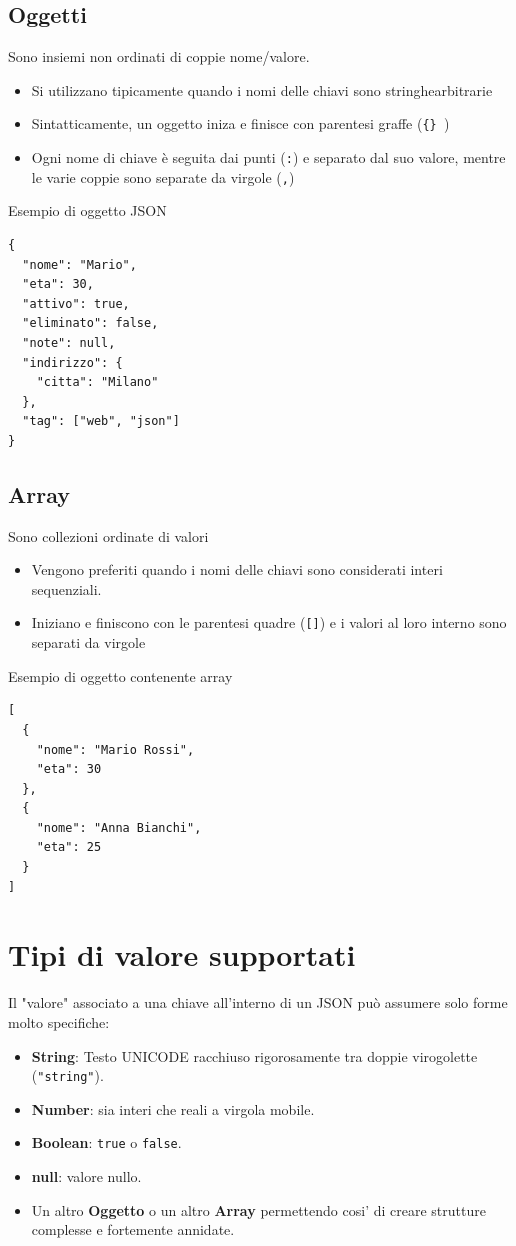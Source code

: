 \subsection{Oggetti}
Sono insiemi non ordinati di coppie nome/valore.
\begin{itemize}
    \item Si utilizzano tipicamente quando i nomi delle chiavi sono stringhearbitrarie
    \item Sintatticamente, un oggetto iniza e finisce con parentesi graffe (\texttt{\{\} })
    \item Ogni nome di chiave è seguita dai punti (\texttt{:}) e separato dal suo valore, mentre le varie coppie sono separate da virgole (\texttt{,}) 
\end{itemize}

\begin{tcolorbox}{Esempio di oggetto JSON}
    \begin{lstlisting}
{
  "nome": "Mario",
  "eta": 30,
  "attivo": true,
  "eliminato": false,
  "note": null,
  "indirizzo": {
    "citta": "Milano"
  },
  "tag": ["web", "json"]
}
    \end{lstlisting}
\end{tcolorbox}

\subsection{Array}
Sono collezioni ordinate di valori
\begin{itemize}
    \item Vengono preferiti quando i nomi delle chiavi sono considerati interi sequenziali.
    \item Iniziano e finiscono con le parentesi quadre (\texttt{[]}) e i valori al loro interno sono separati da virgole
\end{itemize}
\begin{tcolorbox}{Esempio di oggetto contenente array}
\begin{lstlisting}
[
  {
    "nome": "Mario Rossi",
    "eta": 30
  },
  {
    "nome": "Anna Bianchi",
    "eta": 25
  }
]
\end{lstlisting}
\end{tcolorbox}

\section{Tipi di valore supportati}
Il "valore" associato a una chiave all'interno di un JSON può assumere solo forme molto specifiche:
\begin{itemize}
    \item \textbf{String}: Testo UNICODE racchiuso rigorosamente tra doppie virogolette (\texttt{"string"}).
    \item \textbf{Number}: sia interi che reali a virgola mobile.
    \item \textbf{Boolean}: \texttt{true} o \texttt{false}.
    \item \textbf{null}: valore nullo.
    \item Un altro \textbf{Oggetto} o un altro \textbf{Array} permettendo cosi' di creare strutture complesse e fortemente annidate.
\end{itemize}

